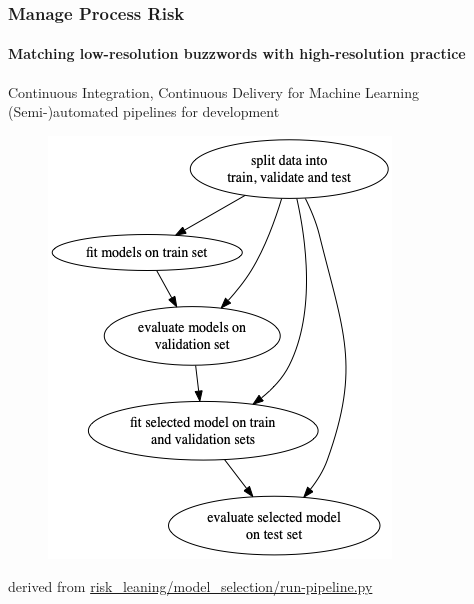 \begin{frame}
    \frametitle{Manage Process Risk}
    \framesubtitle{Matching low-resolution buzzwords with high-resolution practice}
    \begin{block}{Continuous Integration, Continuous Delivery for Machine Learning}
        (Semi-)automated pipelines for development
        \begin{figure}[ht]
            \includegraphics[height=0.5\textheight]{graphics/ml_pipeline}
        \end{figure}
        derived from \href{https://github.com/munichpavel/risk-ai-workshop/blob/main/risk_learning/model_selection/run-pipeline.py}{risk\_leaning/model\_selection/run-pipeline.py}
    \end{block}
\end{frame}

